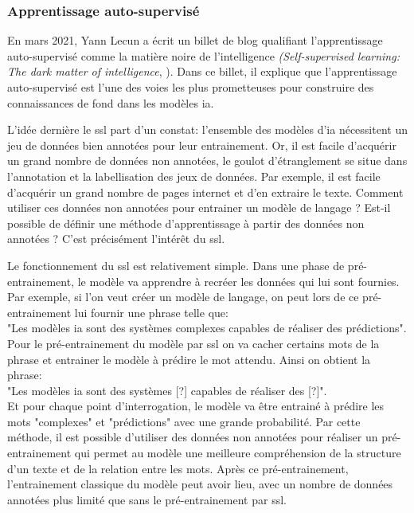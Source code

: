 \subsubsection{Apprentissage auto-supervisé}
En mars 2021, Yann Lecun a écrit un billet de blog qualifiant l'apprentissage auto-supervisé comme la matière noire de l'intelligence \textit{(Self-supervised learning: The dark matter of intelligence}, \cite{lecun_self-supervised_2021}). Dans ce billet, il explique que l'apprentissage auto-supervisé est l'une des voies les plus prometteuses pour construire des connaissances de fond dans les modèles \gls{ia}.


L'idée dernière le \gls{ssl} part d'un constat: l'ensemble des modèles d'\gls{ia} nécessitent un jeu de données bien annotées pour leur entrainement. Or, il est facile d'acquérir un grand nombre de données non annotées, le goulot d'étranglement se situe dans l'annotation et la labellisation des jeux de données. Par exemple, il est facile d'acquérir un grand nombre de pages internet et d'en extraire le texte. Comment utiliser ces données non annotées pour entrainer un modèle de langage ? Est-il possible de définir une méthode d'apprentissage à partir des données non annotées ? C'est précisément l'intérêt du \gls{ssl}.


Le fonctionnement du \gls{ssl} est relativement simple. Dans une phase de pré-entrainement, le modèle va apprendre à recréer les données qui lui sont fournies. Par exemple, si l'on veut créer un modèle de langage, on peut lors de ce pré-entrainement lui fournir une phrase telle que: \\
"Les modèles \gls{ia} sont des systèmes complexes capables de réaliser des prédictions". \\
Pour le pré-entrainement du modèle par \gls{ssl} on va cacher certains mots de la phrase et entrainer le modèle à prédire le mot attendu. Ainsi on obtient la phrase: \\
"Les modèles \gls{ia} sont des systèmes [?] capables de réaliser des [?]". \\
Et pour chaque point d'interrogation, le modèle va être entrainé à prédire les mots "complexes" et "prédictions" avec une grande probabilité. Par cette méthode, il est possible d'utiliser des données non annotées pour réaliser un pré-entrainement qui permet au modèle une meilleure compréhension de la structure d'un texte et de la relation entre les mots. Après ce pré-entrainement, l'entrainement classique du modèle peut avoir lieu, avec un nombre de données annotées plus limité que sans le pré-entrainement par \gls{ssl}.


